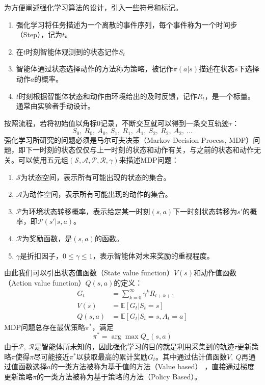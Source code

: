 为方便阐述强化学习算法的设计，引入一些符号和标记。
\begin{enumerate}
  \item 强化学习将任务描述为一个离散的事件序列，每个事件称为一个时间步（Step），记为$t$。
  \item 在$t$时刻智能体观测到的状态记作$S_t$
  \item 智能体通过状态选择动作的方法称为策略，被记作$\pi(a|s)$描述在状态$s$下选择动作$a$的概率。
  \item $t$时刻根据智能体状态和动作由环境给出的及时反馈，记作$R_t$，是一个标量。通常由实验者手动设计。
\end{enumerate}
按照流程，若将初始值以角标$0$记录，不断交互就可以得到一条交互轨迹$\tau$：
\[
  S_0,\ R_0,\ A_0,\ S_1,\ R_1,\ A_1,\ S_2,\ R_2,\ A_2,\ \dots
\]
强化学习所研究的问题必须是马尔可夫决策（Markov Decision Process, MDP）问题，即下一时刻的状态仅仅与上一时刻的状态和动作有关，与之前的状态和动作无关。可以使用五元组$(\mathcal{S,A,P,R,}\gamma)$来描述MDP问题：
\begin{enumerate}
  \item $\mathcal{S}$为状态空间，表示所有可能出现的状态的集合。
  \item $\mathcal{A}$为动作空间，表示所有可能出现的动作的集合。
  \item $\mathcal{P}$为环境状态转移概率，表示给定某一时刻$(s,a)$下一时刻状态转移为$s'$的概率，即$\mathcal{P}(s'|s,a)$。
  \item $\mathcal{R}$为奖励函数，是$(s,a)$的函数。
  \item $\gamma$是折扣因子，$0\leq\gamma\leq 1$，表示智能体对未来奖励的重视程度。
\end{enumerate}

由此我们可以引出状态值函数（State value function）$V(s)$和动作值函数（Action value function）$Q(s,a)$的定义：
\[\begin{aligned}
  G_t &= \sum_{k=0}^{\infty} \gamma^k R_{t+k+1}\\
  V(s) &= \mathbb{E}[G_t|S_t=s]\\
  Q(s,a) &= \mathbb{E}[G_t|S_t=s,A_t=a]
\end{aligned}\]
MDP问题总存在最优策略$\pi^*$，满足
\[
  \pi^* = \arg\max {Q_\pi(s,a)}
\]
由于$\mathcal{P},\ \mathcal{R}$是智能体所未知的，因此强化学习的目的就是利用采集到的轨迹$\tau$更新策略$\pi$使得$\pi$尽可能接近$\pi^*$以获取最高的累计奖励$G_t$。其中通过估计值函数$V,\ Q$再通过值函数选择$a$的一类方法被称为基于值的方法（Value based） ，直接通过梯度更新策略$\pi$的一类方法被称为基于策略的方法（Policy Based）。

